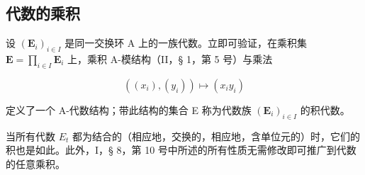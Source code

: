 \subsection{代数的乘积}

设 \((\mathbf{E}_i)_{i\in I}\) 是同一交换环 A 上的一族代数。立即可验证，在乘积集 \(\mathbf{E} = \prod_{i\in I}\mathbf{E}_i\) 上，乘积 A-模结构（II，§ 1，第 5 号）与乘法

\[
\left(\left(x _ {i}\right), \left(y _ {i}\right)\right) \mapsto \left(x _ {i} y _ {i}\right)\tag{4}
\]

定义了一个 A-代数结构；带此结构的集合 E 称为代数族 \((\mathbf{E}_{i})_{i\in I}\) 的积代数。

当所有代数 \(E_{t}\) 都为结合的（相应地，交换的，相应地，含单位元的）时，它们的积也是如此。此外，I，§ 8，第 10 号中所述的所有性质无需修改即可推广到代数的任意乘积。

